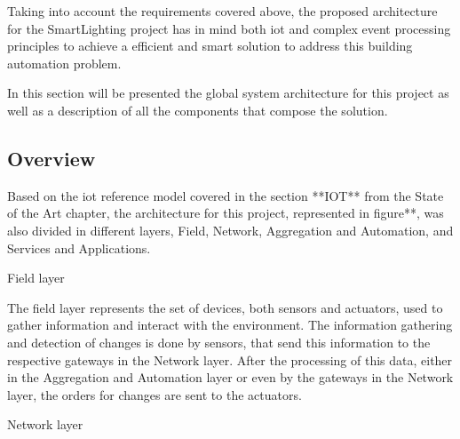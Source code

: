 Taking into account the requirements covered above, the proposed architecture for the SmartLighting project has in mind both \ac{iot} and complex event processing principles to achieve a efficient and smart solution to address this building automation problem.

In this section will be presented the global system architecture for this project as well as a description of all the components that compose the solution.

\subsection{Overview}

Based on the \ac{iot} reference model covered in the section **IOT** from the State of the Art chapter, the architecture for this project, represented in figure**, was also divided in different layers, Field, Network, Aggregation and Automation, and Services and Applications.


\begin{Paragraph}{Field layer}
	
The field layer represents the set of devices, both sensors and actuators, used to gather information and interact with the environment. The information gathering and detection of changes is done by sensors, that send this information to the respective gateways in the Network layer. After the processing of this data, either in the Aggregation and Automation layer or even by the gateways in the Network layer, the orders for changes are sent to the actuators.
	
\end{Paragraph}

\begin{Paragraph}{Network layer}
	

	
\end{Paragraph}









